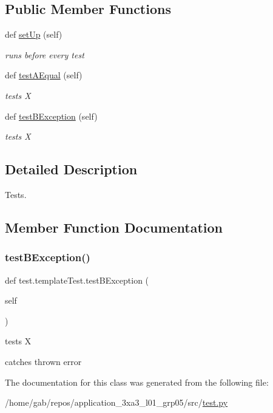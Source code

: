 \subsection*{Public Member Functions}
\begin{DoxyCompactItemize}
\item 
\mbox{\label{classtest_1_1templateTest_ad521602ca86084ef419755d76c732dc8}} 
def \hyperlink{classtest_1_1templateTest_ad521602ca86084ef419755d76c732dc8}{set\+Up} (self)
\begin{DoxyCompactList}\small\item\em runs before every test \end{DoxyCompactList}\item 
\mbox{\label{classtest_1_1templateTest_a85b2889c84ac2b27e4ba38c574d62b9a}} 
def \hyperlink{classtest_1_1templateTest_a85b2889c84ac2b27e4ba38c574d62b9a}{test\+A\+Equal} (self)
\begin{DoxyCompactList}\small\item\em tests X \end{DoxyCompactList}\item 
def \hyperlink{classtest_1_1templateTest_ae7eca3c8bbe8224c4b8c28bcfeb5d50f}{test\+B\+Exception} (self)
\begin{DoxyCompactList}\small\item\em tests X \end{DoxyCompactList}\end{DoxyCompactItemize}


\subsection{Detailed Description}
Tests. 

\subsection{Member Function Documentation}
\mbox{\label{classtest_1_1templateTest_ae7eca3c8bbe8224c4b8c28bcfeb5d50f}} 
\subsubsection{\texorpdfstring{test\+B\+Exception()}{testBException()}}
{\footnotesize\ttfamily def test.\+template\+Test.\+test\+B\+Exception (\begin{DoxyParamCaption}\item[{}]{self }\end{DoxyParamCaption})}



tests X 

catches thrown error 

The documentation for this class was generated from the following file\+:\begin{DoxyCompactItemize}
\item 
/home/gab/repos/application\+\_\+3xa3\+\_\+l01\+\_\+grp05/src/\hyperlink{test_8py}{test.\+py}\end{DoxyCompactItemize}
